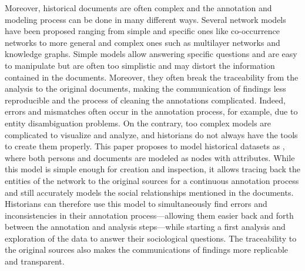 Moreover, historical documents are often complex and the annotation and modeling process can be done in many different ways.
Several network models have been proposed ranging from simple and specific ones like co-occurrence networks to more general and complex ones such as multilayer networks and knowledge graphs.
Simple models allow answering specific questions and are easy to manipulate but are often too simplistic and may distort the information contained in the documents.
Moreover, they often break the traceability from the analysis to the original documents, making the communication of findings less reproducible and the process of cleaning the annotations complicated.
Indeed, errors and mismatches often occur in the annotation process, for example, due to entity disambiguation problems.
On the contrary, too complex models are complicated to visualize and analyze, and historians do not always have the tools to create them properly.
This paper proposes to model historical datasets as \modelplural, where both persons and documents are modeled as nodes with attributes.
While this model is simple enough for creation and inspection, it allows tracing back the entities of the network to the original sources for a continuous annotation process and still accurately models the social relationships mentioned in the documents.
Historians can therefore use this model to simultaneously find errors and inconsistencies in their annotation process---allowing them easier back and forth between the annotation and analysis steps---while starting a first analysis and exploration of the data to answer their sociological questions.
The traceability to the original sources also makes the communications of findings more replicable and transparent.





